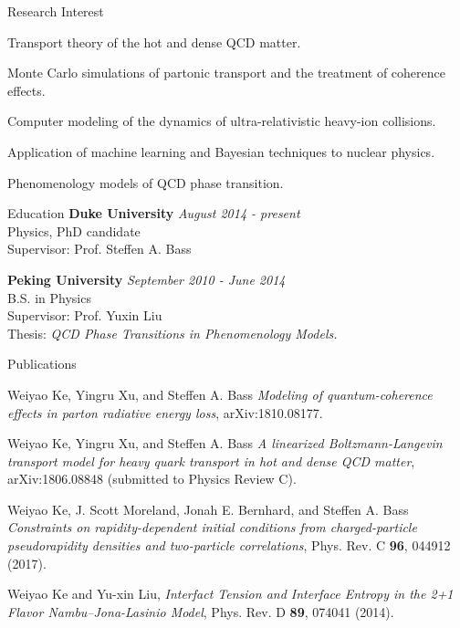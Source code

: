 \documentclass{resume} %
\begin{document}
\begin{rSection}{Research Interest}
\vspace{.3em}
\begin{Article}
\item Transport theory of the hot and dense QCD matter.
\vspace{.3em}
\item Monte Carlo simulations of partonic transport and the treatment of coherence effects.
\vspace{.3em}
\item Computer modeling of the dynamics of ultra-relativistic heavy-ion collisions.
\vspace{.3em}
\item Application of machine learning and Bayesian techniques to nuclear physics.
\vspace{.3em}
\item Phenomenology models of QCD phase transition.
\end{Article}
\end{rSection}


\begin{rSection}{Education}
{\bf Duke University} \hfill {\em August 2014 - present} \\ 
Physics, PhD candidate \\
Supervisor: Prof. Steffen A. Bass

{\bf Peking University} \hfill {\em September 2010 - June 2014} \\ 
B.S. in Physics \\
Supervisor: Prof. Yuxin Liu \\
Thesis: {\it QCD Phase Transitions in Phenomenology Models. }
\end{rSection}

\begin{rSection}{Publications}
\vspace{.3em}
\begin{Article}
\item Weiyao Ke, Yingru Xu, and Steffen A. Bass {\it Modeling of quantum-coherence effects in parton radiative energy loss}, arXiv:1810.08177.
\vspace{.3em}
\item Weiyao Ke, Yingru Xu, and Steffen A. Bass {\it A linearized Boltzmann-Langevin transport model for heavy quark transport in hot and dense QCD matter}, arXiv:1806.08848 (submitted to Physics Review C).
\vspace{.3em}
\item Weiyao Ke, J. Scott Moreland, Jonah E. Bernhard, and Steffen A. Bass {\it Constraints on rapidity-dependent initial conditions from charged-particle pseudorapidity densities and two-particle correlations}, Phys. Rev. C {\bf 96}, 044912 (2017).
\vspace{.3em}
\item Weiyao Ke and Yu-xin Liu, {\it Interfact Tension and Interface Entropy in the 2+1 Flavor Nambu--Jona-Lasinio Model}, Phys. Rev. D {\bf 89}, 074041 (2014).
\end{Article}
\end{rSection}
\end{document}
